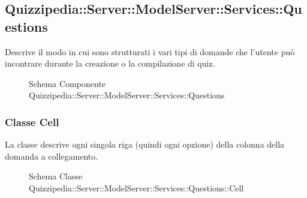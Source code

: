\subsection{Quizzipedia::Server::ModelServer::Services::Questions}
Descrive il modo in cui sono strutturati i vari tipi di domande che l'utente può incontrare durante la creazione o la compilazione di quiz.
\begin{figure}[H]
\centering
\noindent{}
\caption[Schema Componente Quizzipedia::Server::ModelServer::Services::Questions]{Schema Componente Quizzipedia::Server::ModelServer::Services::Questions}
\end{figure}
\subsubsection{Classe Cell}
La classe descrive ogni singola riga (quindi ogni opzione) della colonna della domanda a collegamento.
\begin{figure}[H]
\centering
\noindent{}
\caption[Schema Classe Cell]{Schema Classe Quizzipedia::Server::ModelServer::Services::Questions::Cell}
\end{figure}
